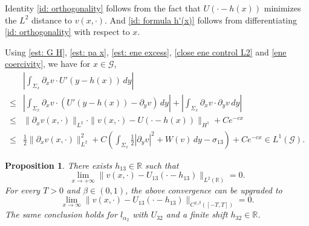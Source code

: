 \documentclass[leqno,11pt]{amsart}
\let\pa=\partial
\let\f=\frac
\let\S=\Sigma
\let\pa=\partial
\newtheorem{proposition}[theorem]{Proposition}
\theoremstyle{remark}
\newcommand{\BR}{\mathbb{R}}
\begin{document}
Identity \eqref{id: orthogonality} follows from the fact that $U(\cdot-h(x))$ minimizes the $L^2$ distance to $v(x,\cdot)$. And \eqref{id: formula h'(x)} follows from differentiating \eqref{id: orthogonality} with respect to $x$. 


Using \eqref{est: G H}, \eqref{est: pa x}, \eqref{est: ene excess}, \eqref{close ene control L2} and \eqref{ene coercivity}, we have for $x\in\mathcal{G}$,
\begin{equation}\label{est: h' numerator 1}
    \begin{split}
        &\left|\int_{\S_x} \pa_xv\cdot U'(y-h(x))\,dy\right|\\
        \leq  & \left|\int_{\S_x}\pa_xv\cdot (U'(y-h(x))-\pa_yv)\,dy\right|+\left| \int_{\S_x} \pa_x v\cdot\pa_y v\,dy \right|\\
        \leq & \|\pa_x v(x,\cdot)\|_{L^2}\cdot\|v(x,\cdot)-U(\cdot-h(x))\|_{H^1} +Ce^{-cx}\\
        \leq & \f12 \|\pa_x v(x,\cdot)\|_{L^2}^2+C(\int_{\S_x}\f12|\pa_y v|^2+W(v)\,dy-\sigma_{13}) + Ce^{-cx}\in L^1(\mathcal{G}).
    \end{split}
\end{equation}

\begin{proposition}
\label{prop:translate}
There exists $h_{13}\in\BR$ such that
\begin{equation}\label{L2 convergence}
\lim_{x\to+\infty} \| v(x,\cdot)-U_{13}(\cdot-h_{13})\|_{L^2(\BR)}=0.
\end{equation}
For every $T>0$ and $\beta\in(0,1)$, the above convergence can be upgraded to
\begin{equation}\label{loc C2b convergence}
\lim_{x\to\infty} \|v(x,\cdot)-U_{13}(\cdot-h_{13})\|_{C^{2,\beta}([-T,T])}=0.
\end{equation}
The same conclusion holds for $l_{\alpha_2}$ with $U_{32}$ and a finite shift $h_{32}\in\BR$.
\end{proposition}
\end{document}
